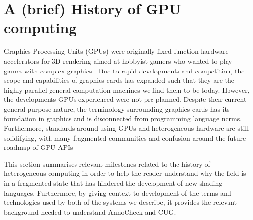\documentclass[a4paper,12pt,twoside,openright]{report}
\begin{document}


\section{A (brief) History of GPU computing}

\label{sec:history_gpu}

Graphics Processing Units (GPUs) were originally fixed-function hardware
accelerators for 3D rendering aimed at hobbyist gamers who wanted to play games
with complex graphics \cite{GLQuake}. Due to rapid developments and
competition, the scope and capabilities of graphics cards has expanded such
that they are the highly-parallel general computation machines we find them to
be today. However, the developments GPUs experienced were not pre-planned.
Despite their current general-purpose nature, the terminology surrounding
graphics cards has its foundation in graphics and is disconnected from
programming language norms. Furthermore, standards around using GPUs and
heterogeneous hardware are still solidifying, with many fragmented communities
and confusion around the future roadmap of GPU APIs \cite{TODO}.

This section summarises relevant milestones related to the history of
heterogeneous computing in order to help the reader understand why the field is
in a fragmented state that has hindered the development of new shading
languages. Furthermore, by giving context to development of the terms and
technologies used by both of the systems we describe, it provides the relevant
background needed to understand AnnoCheck and CUG.
\end{document}
